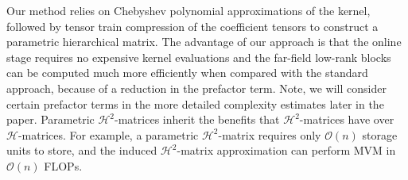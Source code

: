 \documentclass[final,3p,times]{elsarticle}
\newcommand{\mc}[1]{\mathcal{#1}}
\begin{document}
Our method relies on Chebyshev polynomial approximations of the kernel, followed by tensor train compression of the coefficient tensors to construct a parametric hierarchical matrix. The advantage of our approach is that the online stage requires no expensive kernel evaluations and the far-field low-rank blocks can be computed much more efficiently when compared with the standard approach, because of a reduction in the prefactor term. Note, we will consider certain prefactor terms in the more detailed complexity estimates later in the paper.
Parametric $\mc{H}^{2}$-matrices inherit the benefits that $\mc{H}^{2}$-matrices have over $\mc{H}$-matrices. For example, a parametric $\mc{H}^{2}$-matrix  requires only $\mc{O}(n)$ storage units to store, and the induced $\mc{H}^{2}$-matrix approximation can perform MVM  in $\mc{O}(n)$ FLOPs. 
\end{document}
